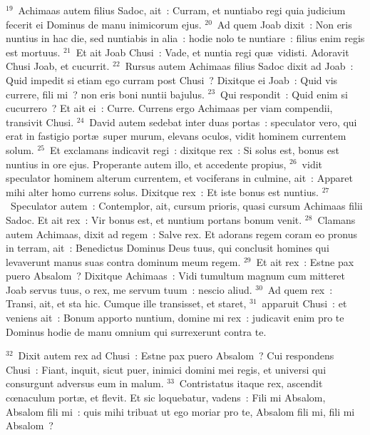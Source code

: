 ${}^{19}$~Achimaas autem filius Sadoc, ait~: Curram, et nuntiabo regi quia judicium fecerit ei Dominus de manu inimicorum ejus.
${}^{20}$~Ad quem Joab dixit~: Non eris nuntius in hac die, sed nuntiabis in alia~: hodie nolo te nuntiare~: filius enim regis est mortuus.
${}^{21}$~Et ait Joab Chusi~: Vade, et nuntia regi qu\ae\ vidisti. Adoravit Chusi Joab, et cucurrit.
${}^{22}$~Rursus autem Achimaas filius Sadoc dixit ad Joab~: Quid impedit si etiam ego curram post Chusi~? Dixitque ei Joab~: Quid vis currere, fili mi~? non eris boni nuntii bajulus.
${}^{23}$~Qui respondit~: Quid enim si cucurrero~? Et ait ei~: Curre. Currens ergo Achimaas per viam compendii, transivit Chusi.
${}^{24}$~David autem sedebat inter duas portas~: speculator vero, qui erat in fastigio port\ae\ super murum, elevans oculos, vidit hominem currentem solum.
${}^{25}$~Et exclamans indicavit regi~: dixitque rex~: Si solus est, bonus est nuntius in ore ejus. Properante autem illo, et accedente propius,
${}^{26}$~vidit speculator hominem alterum currentem, et vociferans in culmine, ait~: Apparet mihi alter homo currens solus. Dixitque rex~: Et iste bonus est nuntius.
${}^{27}$~Speculator autem~: Contemplor, ait, cursum prioris, quasi cursum Achimaas filii Sadoc. Et ait rex~: Vir bonus est, et nuntium portans bonum venit.
${}^{28}$~Clamans autem Achimaas, dixit ad regem~: Salve rex. Et adorans regem coram eo pronus in terram, ait~: Benedictus Dominus Deus tuus, qui conclusit homines qui levaverunt manus suas contra dominum meum regem.
${}^{29}$~Et ait rex~: Estne pax puero Absalom~? Dixitque Achimaas~: Vidi tumultum magnum cum mitteret Joab servus tuus, o rex, me servum tuum~: nescio aliud.
${}^{30}$~Ad quem rex~: Transi, ait, et sta hic. Cumque ille transisset, et staret,
${}^{31}$~apparuit Chusi~: et veniens ait~: Bonum apporto nuntium, domine mi rex~: judicavit enim pro te Dominus hodie de manu omnium qui surrexerunt contra te.


${}^{32}$~Dixit autem rex ad Chusi~: Estne pax puero Absalom~? Cui respondens Chusi~: Fiant, inquit, sicut puer, inimici domini mei regis, et universi qui consurgunt adversus eum in malum.
${}^{33}$~Contristatus itaque rex, ascendit cœnaculum port\ae , et flevit. Et sic loquebatur, vadens~: Fili mi Absalom, Absalom fili mi~: quis mihi tribuat ut ego moriar pro te, Absalom fili mi, fili mi Absalom~?

